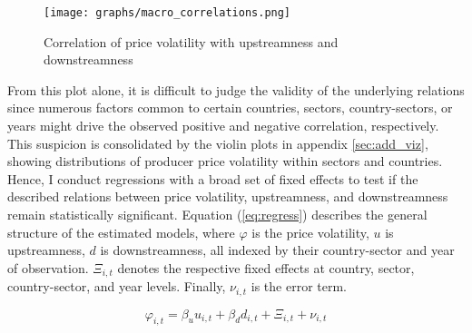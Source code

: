 \begin{figure}[H]
    \texttt{[image: graphs/macro\_correlations.png]}
    \caption{\label{fig:macro_corr} Correlation of price volatility with upstreamness and downstreamness}
\end{figure}

From this plot alone, it is difficult to judge the validity of the underlying relations since numerous factors common to certain 
countries, sectors, country-sectors, or years might drive the observed positive and negative correlation, respectively. This suspicion 
is consolidated by the violin plots in appendix \ref{sec:add_viz}, showing distributions of producer price volatility within sectors 
and countries. Hence, I conduct regressions with a broad set of fixed effects to test if the described relations between price volatility, 
upstreamness, and downstreamness remain statistically significant. Equation (\ref{eq:regress}) describes the general structure of the 
estimated models, where $\varphi$ is the price volatility, $u$ is upstreamness, $d$ is downstreamness, all indexed by their country-sector 
and year of observation. $\Xi_{i,t}$ denotes the respective fixed effects at country, sector, country-sector, and year levels. Finally, 
$\nu_{i,t}$ is the error term.

\begin{equation} \label{eq:regress}
    \varphi_{i,t} = \beta_u u_{i,t} + \beta_d d_{i,t} + \Xi_{i,t} + \nu_{i,t}
\end{equation}

